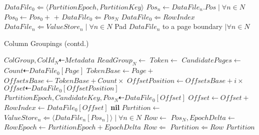 \documentclass[fleqn]{article}
\begin{document}
\begin{algorithm}
\begin{algorithmic}[1]
   \EndFor
    \State $DataFile_{0} \Leftarrow \langle PartitionEpoch, PartitionKey \rangle$
    \State $Pos_{n} \gets DataFile_{n}.Pos \mid \forall n \in N$
    \State $Pos_{0} \gets Pos_0 + $  $ + $ 
    \State $DataFile_{0} \Leftarrow Pos_{N}$
    \State $DataFile_{0} \Leftarrow RowIndex$
    \State $DataFile_{n} \Leftarrow ValueStore_{n} \mid \forall n \in N$
    \State Pad $DataFile_{n}$ to a page boundary $\mid \forall n \in N$
   \EndFor
\EndProcedure
\end{algorithmic}
\end{algorithm}

\begin{algorithm}
\setcounter{algorithm}{2}
\scriptsize
\caption{Column Groupings (contd.)}
\begin{algorithmic}[1]
\State $ColGroup, ColId_N \dashleftarrow Metadata$
\State $ReadGroup_N \gets $ 
\State $Token \gets $ 
\State $CandidatePages \gets $
 \State $Count \dashleftarrow DataFile_{0}[Page]$
 \State $TokenBase \gets Page +  $ 
 \State $OffsetsBase \gets TokenBase + Count \times $
 \For{$i \gets $ \Call{Find}{$DataFile_0[TokenBase \dots OffsetBase), Token$}}
  \State $OffsetPosition \gets OffsetsBase + i \times $ 
  \State $Offset \dashleftarrow DataFile_{0}[OffsetPosition]$
  \State $PartitionEpoch, CandidateKey, Pos_N \dashleftarrow DataFile_{0}[Offset]$
   \State $Offset \gets Offset + $ 
   \State $RowIndex \gets DataFile_0[Offset]$
   \State \Return {}
  \EndIf
 \EndFor
\EndFor
\Return \textbf{nil}
\EndFunction
\Statex
{}
\State $Partition \gets $ 
\State $ValueStore_n \Leftarrow \langle DataFile_n[Pos_n] \rangle \mid \forall n \in N$
 \State $Row \gets $ 
 \State $Pos_N, EpochDelta \gets$ 
 \State $RowEpoch \gets PartitionEpoch + EpochDelta$
  \State $Row \Leftarrow $ 
 \EndFor
 \State $Partition \Leftarrow Row$
\EndFor
\Return $Partition$
\EndFunction
\end{algorithmic}
\end{algorithm}
\end{document}
